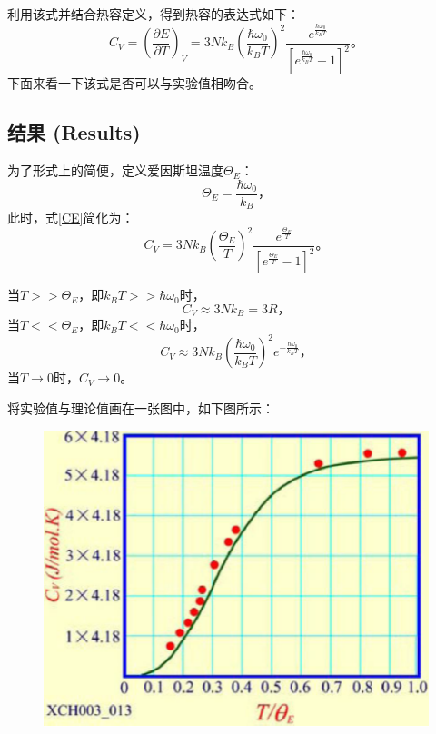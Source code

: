 \documentclass[declarePage]{ecnuthesis}
\begin{document}
利用该式并结合热容定义，得到热容的表达式如下：
\begin{equation}
    C_V = \left( \frac{\partial E}{\partial T} \right) _V = 3N k_B \left( \frac{\hbar \omega_0}{k_BT}\right) ^2 \frac{e^{\frac{\hbar \omega_0}{k_BT}}}{\left[e^ \frac{\hbar \omega_0}{k_BT}-1 \right]^2} \text{。} \label{CE}
\end{equation}
下面来看一下该式是否可以与实验值相吻合。

\subsection{结果 (Results)}

为了形式上的简便，定义爱因斯坦温度$\Theta _E$：
\begin{equation}
    \Theta _E = \frac{\hbar \omega_0}{k_B} \text{，} 
\end{equation}
此时，式\ref{CE}简化为：
\begin{equation}
    C_V = 3N k_B \left( \frac{\Theta _E}{T}\right) ^2 \frac{e^{\frac{\Theta _E}{T}}}{\left[e^ \frac{\Theta _E}{T}-1 \right]^2} \text{。}
\end{equation}

当$T>>\Theta _E$，即$k_B T>>\hbar \omega_0$时，
\begin{equation}
    C_V \approx 3N k_B = 3R \text{，}
\end{equation}
当$T<<\Theta _E$，即$k_B T<<\hbar \omega_0$时，
\begin{equation}
    C_V \approx 3N k_B \left( \frac{\hbar \omega_0}{k_BT}\right) ^2 e^{-\frac{\hbar \omega_0}{k_BT}} \text{，}
\end{equation}
当$T \rightarrow 0$时，$C_V \rightarrow 0$。

将实验值与理论值画在一张图中，如下图所示：
\begin{figure}[htb]
    \centering
    \includegraphics[width=.5\textwidth]{CES.png}
\end{figure}
\end{document}
